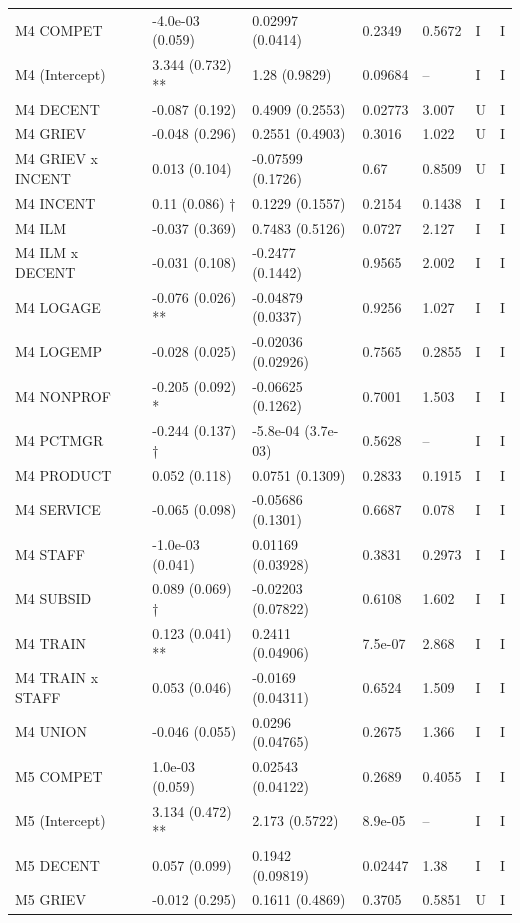 {\begin{longtable}{@{}p{.245\linewidth}p{.17\linewidth}p{.17\linewidth}p{.085\linewidth}p{.060\linewidth}p{.08\linewidth}p{.07\linewidth}@{}}
M4 COMPET & -4.0e-03 (0.059) & 0.02997 (0.0414) & 0.2349 & 0.5672 & I & I\\
M4 (Intercept) & 3.344 (0.732) ** & 1.28 (0.9829) & 0.09684 & -- & I & I\\
M4 DECENT & -0.087 (0.192) & 0.4909 (0.2553) & 0.02773 & 3.007 & U & I\\
M4 GRIEV & -0.048 (0.296) & 0.2551 (0.4903) & 0.3016 & 1.022 & U & I\\
M4 GRIEV x INCENT & 0.013 (0.104) & -0.07599 (0.1726) & 0.67 & 0.8509 & U & I\\
M4 INCENT & 0.11 (0.086) † & 0.1229 (0.1557) & 0.2154 & 0.1438 & I & I\\
M4 ILM & -0.037 (0.369) & 0.7483 (0.5126) & 0.0727 & 2.127 & I & I\\
M4 ILM x DECENT & -0.031 (0.108) & -0.2477 (0.1442) & 0.9565 & 2.002 & I & I\\
M4 LOGAGE & -0.076 (0.026) ** & -0.04879 (0.0337) & 0.9256 & 1.027 & I & I\\
M4 LOGEMP & -0.028 (0.025) & -0.02036 (0.02926) & 0.7565 & 0.2855 & I & I\\
M4 NONPROF & -0.205 (0.092) * & -0.06625 (0.1262) & 0.7001 & 1.503 & I & I\\
M4 PCTMGR & -0.244 (0.137) † & -5.8e-04 (3.7e-03) & 0.5628 & -- & I & I\\
M4 PRODUCT & 0.052 (0.118) & 0.0751 (0.1309) & 0.2833 & 0.1915 & I & I\\
M4 SERVICE & -0.065 (0.098) & -0.05686 (0.1301) & 0.6687 & 0.078 & I & I\\
M4 STAFF & -1.0e-03 (0.041) & 0.01169 (0.03928) & 0.3831 & 0.2973 & I & I\\
M4 SUBSID & 0.089 (0.069) † & -0.02203 (0.07822) & 0.6108 & 1.602 & I & I\\
M4 TRAIN & 0.123 (0.041) ** & 0.2411 (0.04906) & 7.5e-07 & 2.868 & I & I\\
M4 TRAIN x STAFF & 0.053 (0.046) & -0.0169 (0.04311) & 0.6524 & 1.509 & I & I\\
M4 UNION & -0.046 (0.055) & 0.0296 (0.04765) & 0.2675 & 1.366 & I & I\\
M5 COMPET & 1.0e-03 (0.059) & 0.02543 (0.04122) & 0.2689 & 0.4055 & I & I\\
M5 (Intercept) & 3.134 (0.472) ** & 2.173 (0.5722) & 8.9e-05 & -- & I & I\\
M5 DECENT & 0.057 (0.099) & 0.1942 (0.09819) & 0.02447 & 1.38 & I & I\\
M5 GRIEV & -0.012 (0.295) & 0.1611 (0.4869) & 0.3705 & 0.5851 & U & I\\

\end{longtable}}
